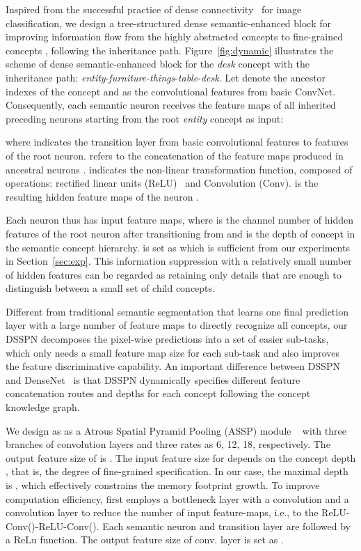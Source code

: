 \documentclass[10pt,twocolumn,letterpaper]{article}
\begin{document}
Inspired from the successful practice of dense connectivity~\cite{huang2016densely} for image classification, we design a tree-structured dense semantic-enhanced block for improving information flow from the highly abstracted concepts to fine-grained concepts , following the inheritance path. Figure~\ref{fig:dynamic} illustrates the scheme of dense semantic-enhanced block for the \emph{desk} concept with the inheritance path: \emph{entity}-\emph{furniture-things}-\emph{table}-\emph{desk}. Let  denote the ancestor indexes of the concept  and  as the convolutional features  from basic ConvNet. Consequently, each semantic neuron  receives the feature maps  of all inherited preceding neurons  starting from the root \emph{entity} concept as input:

where  indicates the transition layer from basic convolutional features  to features  of the root neuron.  refers to the concatenation of the feature maps produced in ancestral neurons .  indicates the non-linear transformation function, composed of operations: rectified linear units (ReLU)~\cite{glorot2011deep} and Convolution (Conv).  is the resulting  hidden feature maps of the neuron . 

Each neuron  thus has  input
feature maps, where  is the channel number of hidden features  of the root neuron after transitioning from  and  is the depth of concept  in the semantic concept hierarchy.  is set as  which is sufficient from our experiments in Section~\ref{sec:exp}. This information suppression with a relatively small number of hidden features can be regarded as retaining only details that are enough to distinguish between a small set of child concepts. 

Different from traditional semantic segmentation that learns one final prediction layer with a large number of feature maps to directly recognize all concepts, our DSSPN decomposes the pixel-wise predictions into a set of easier sub-tasks, which only needs a small feature map size for each sub-task and also improves the feature discriminative capability. An important difference between DSSPN and DenseNet~\cite{huang2016densely} is that DSSPN dynamically specifies different feature concatenation routes and depths for each concept following the concept knowledge graph. 

We design  as as a Atrous Spatial Pyramid Pooling (ASSP) module ~\cite{chen2016deeplab} with three branches of  convolution layers and three rates as {6, 12, 18}, respectively. The output feature size of  is . The input feature size for  depends on the concept depth , that is, the degree of fine-grained specification. In our case, the maximal depth is , which effectively constrains the memory footprint growth. To improve computation efficiency,  first employs a bottleneck layer with a  convolution and a  convolution layer to reduce the number of input feature-maps, i.e., to the ReLU-Conv()-ReLU-Conv(). Each semantic neuron and transition layer are followed by a ReLu function. The output feature size of  conv. layer is set as . 
\end{document}
